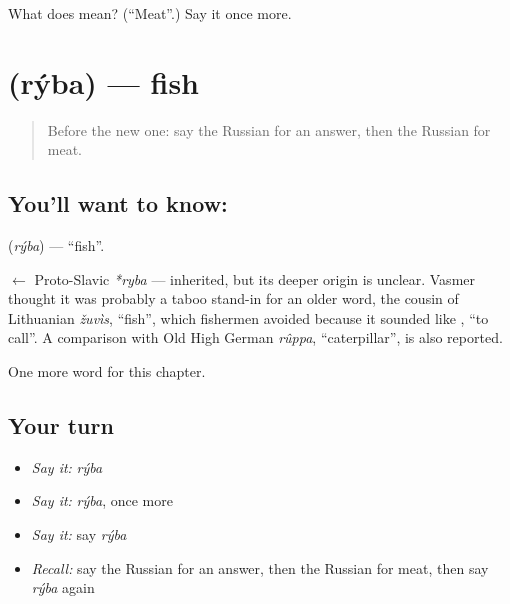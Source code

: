\begin{tcolorbox}[breakable,colback=teal!4,colframe=teal!35!black,title={Before you move on}]
What does  mean? (\textquotedblleft{}Meat\textquotedblright{}.) Say it once more.
\end{tcolorbox}
\section[\texorpdfstring{\ru{рыба} (rýba)}{рыба (rýba)}]{ (rýba) — fish}

\label{lesson:RU-C43-fish}



\begin{quote}
Before the new one: say the Russian for an answer, then the Russian for meat.
\end{quote}

\subsection*{You'll want to know: }
\textbf{} (\emph{rýba}) — \textquotedblleft{}fish\textquotedblright{}.

\begin{cousinweb}
\textbf{} $\leftarrow$ Proto-Slavic \emph{*ryba} — inherited, but its deeper origin is unclear. Vasmer thought it was probably a taboo stand-in for an older word, the cousin of Lithuanian \emph{žuvìs}, \textquotedblleft{}fish\textquotedblright{}, which fishermen avoided because it sounded like \emph{}, \textquotedblleft{}to call\textquotedblright{}. A comparison with Old High German \emph{rûppa}, \textquotedblleft{}caterpillar\textquotedblright{}, is also reported.
\end{cousinweb}

\begin{grammarlens}[title={What you've built}]
One more word for this chapter.
\end{grammarlens}

\subsection*{Your turn}
\begin{itemize}
\raggedright
  \item \emph{Say it:} \emph{rýba}
  \item \emph{Say it:} \emph{rýba}, once more
  \item \emph{Say it:} say \emph{rýba}
  \item \emph{Recall:} say the Russian for an answer, then the Russian for meat, then say \emph{rýba} again
\end{itemize}

